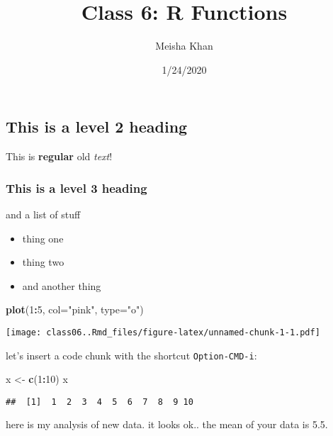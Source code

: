 \documentclass[]{article}
\title{Class 6: R Functions}
\author{Meisha Khan}
\date{1/24/2020}
\newenvironment{Shaded}{\begin{snugshade}}{\end{snugshade}}
\newcommand{\DataTypeTok}[1]{\textcolor[rgb]{0.13,0.29,0.53}{#1}}
\newcommand{\DecValTok}[1]{\textcolor[rgb]{0.00,0.00,0.81}{#1}}
\newcommand{\KeywordTok}[1]{\textcolor[rgb]{0.13,0.29,0.53}{\textbf{#1}}}
\newcommand{\NormalTok}[1]{#1}
\newcommand{\OperatorTok}[1]{\textcolor[rgb]{0.81,0.36,0.00}{\textbf{#1}}}
\newcommand{\StringTok}[1]{\textcolor[rgb]{0.31,0.60,0.02}{#1}}
\providecommand{\tightlist}{%
  \setlength{\itemsep}{0pt}\setlength{\parskip}{0pt}}
\begin{document}
\maketitle

\hypertarget{this-is-a-level-2-heading}{%
\subsection{This is a level 2 heading}\label{this-is-a-level-2-heading}}

This is \textbf{regular} old \emph{text}!

\hypertarget{this-is-a-level-3-heading}{%
\subsubsection{This is a level 3
heading}\label{this-is-a-level-3-heading}}

and a list of stuff

\begin{itemize}
\tightlist
\item
  thing one
\item
  thing two
\item
  and another thing
\end{itemize}

\begin{Shaded}
\begin{Highlighting}[]
\KeywordTok{plot}\NormalTok{(}\DecValTok{1}\OperatorTok{:}\DecValTok{5}\NormalTok{, }\DataTypeTok{col=}\StringTok{"pink"}\NormalTok{, }\DataTypeTok{type=}\StringTok{"o"}\NormalTok{)}
\end{Highlighting}
\end{Shaded}

\texttt{[image: class06..Rmd\_files/figure-latex/unnamed-chunk-1-1.pdf]}

let's insert a code chunk with the shortcut \texttt{Option-CMD-i}:

\begin{Shaded}
\begin{Highlighting}[]
\NormalTok{x <-}\StringTok{ }\KeywordTok{c}\NormalTok{(}\DecValTok{1}\OperatorTok{:}\DecValTok{10}\NormalTok{)}
\NormalTok{x}
\end{Highlighting}
\end{Shaded}

\begin{verbatim}
##  [1]  1  2  3  4  5  6  7  8  9 10
\end{verbatim}

here is my analysis of new data. it looks ok.. the mean of your data is
5.5.
\end{document}
